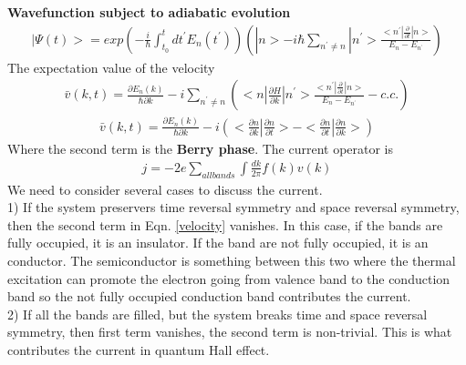 \documentclass[a4paper]{article}
\begin{document}
{\bf Wavefunction subject to adiabatic evolution }
\begin{align*}
	|\Psi(t)>= exp(-\frac{i}{\hbar}\int_{t_0}^{t} dt^{'} E_{n}(t^{'}))(|n> 
	-i\hbar \sum_{n^{'}\neq n} |n^{'}>\frac{<n^{'}|\frac{\partial}{\partial t}|n>}{E_{n} - E_{n^{'}}})
\end{align*}
The expectation value of the velocity
\begin{align*}
	\bar v(k,t) = \frac{\partial E_n(k)}{\hbar \partial k} 
	- i \sum_{n^{'}\neq n} (<n|\frac{\partial H}{\partial k}|n^{'}>\frac{<n^{'}|\frac{\partial}{\partial t}|n>}{E_{n} - E_{n^{'}}} - c.c.)
\end{align*}
\begin{align}\label{velocity}
	\bar v(k,t) = \frac{\partial E_n(k)}{\hbar \partial k} 
	- i  (<\frac{\partial n}{\partial k}| \frac{\partial n}{\partial t}> -<\frac{\partial n}{\partial t}| \frac{\partial n}{\partial k}>)
\end{align}
Where the second term is the {\bf Berry phase}.
The current operator is
\begin{align*}
	j = -2e\sum_{all bands}\int\frac{dk}{2 \pi} f(k)v(k)
\end{align*}
We need to consider several cases to discuss the current.\\
1) If the system preservers time reversal symmetry and space reversal symmetry, then the second term in Eqn. \ref{velocity} vanishes. In this case, if the bands are fully occupied, it is an insulator. If the band are not fully occupied, it is an conductor. The semiconductor is something between this two where the thermal excitation can promote the electron going from valence band to the conduction band so the not fully occupied conduction band contributes the current.\\
2) If all the bands are filled, but the system breaks time and space reversal symmetry, then first term vanishes, the second term is non-trivial. This is what contributes the current in quantum Hall effect.\\
\end{document}
